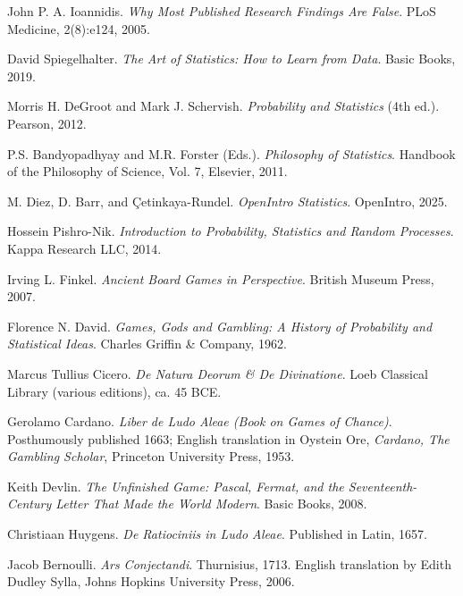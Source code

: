 \documentclass{book}
\begin{document}
\begin{thebibliography}{999}

John P. A. Ioannidis.
\textit{Why Most Published Research Findings Are False}.
PLoS Medicine, 2(8):e124, 2005.

David Spiegelhalter. 
\textit{The Art of Statistics: How to Learn from Data}. 
Basic Books, 2019.

Morris H. DeGroot and Mark J. Schervish.
\textit{Probability and Statistics} (4th ed.).
Pearson, 2012.

P.S. Bandyopadhyay and M.R. Forster (Eds.).
\textit{Philosophy of Statistics}.
Handbook of the Philosophy of Science, Vol. 7, Elsevier, 2011.

M. Diez, D. Barr, and Çetinkaya-Rundel.
\textit{OpenIntro Statistics}.
OpenIntro, 2025.

Hossein Pishro-Nik.
\textit{Introduction to Probability, Statistics and Random Processes}.
Kappa Research LLC, 2014.

Irving L. Finkel.  
\textit{Ancient Board Games in Perspective}.  
British Museum Press, 2007.

Florence N. David.  
\textit{Games, Gods and Gambling: A History of Probability and Statistical Ideas}.  
Charles Griffin \& Company, 1962.

Marcus Tullius Cicero.  
\textit{De Natura Deorum \& De Divinatione}.  
Loeb Classical Library (various editions), ca. 45 BCE.

Gerolamo Cardano.  
\textit{Liber de Ludo Aleae (Book on Games of Chance)}.  
Posthumously published 1663; English translation in Oystein Ore, \textit{Cardano, The Gambling Scholar}, Princeton University Press, 1953.

Keith Devlin.  
\textit{The Unfinished Game: Pascal, Fermat, and the Seventeenth-Century Letter That Made the World Modern}.  
Basic Books, 2008.

Christiaan Huygens.  
\textit{De Ratiociniis in Ludo Aleae}.  
Published in Latin, 1657.

Jacob Bernoulli.  
\textit{Ars Conjectandi}.  
Thurnisius, 1713. English translation by Edith Dudley Sylla, Johns Hopkins University Press, 2006.


\end{thebibliography}
\end{document}
